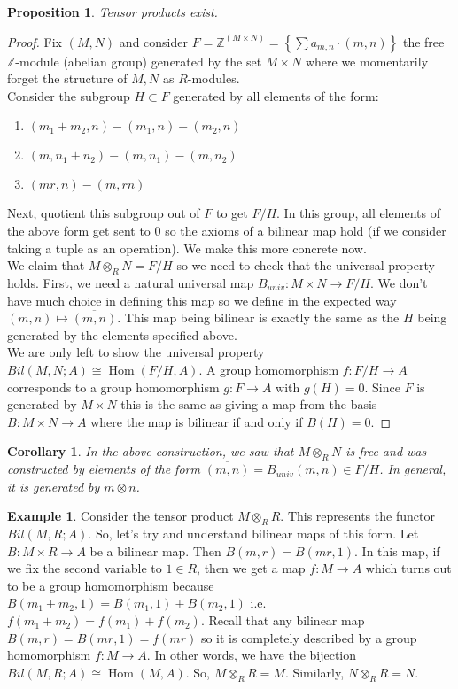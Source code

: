 \documentclass{article}
\newcommand\Z{\ensuremath{\mathbb{Z}}}
\newcommand{\tp}[2]{#1 \otimes_R #2}
\DeclareMathOperator{\Hom}{Hom}
\newtheorem{corollary}{Corollary}[theorem]
\theoremstyle{definition}
\newtheorem{eg}{Example}[subsection]
\theoremstyle{remark}
\theoremstyle{plain}
\newtheorem{prop}{Proposition}[subsection]
\begin{document}
\begin{prop}
    Tensor products exist. 
\end{prop}
\begin{proof}
    Fix \((M,N)\) and consider \(F = \Z^{(M\times N)} = \left\{ \sum a_{m,n}\cdot(m,n) \right\}\) the free \(\Z\)-module 
    (abelian group) generated by the set \(M\times N\) where we momentarily forget the structure of \(M,N\) as \(R\)-modules.\\
    Consider the subgroup \(H \subset F\) generated by all elements of the form:
    \begin{enumerate}
        \item \((m_1 + m_2, n) - (m_1,n) - (m_2, n)\)
        \item \((m, n_1 + n_2) - (m,n_1) - (m, n_2)\)
        \item \((mr,n) - (m, rn)\)
    \end{enumerate}
    Next, quotient this subgroup out of \(F\) to get \(F/H\). In this group, all elements of the above form 
    get sent to \(0\) so the axioms of a bilinear map hold (if we consider taking a tuple as an operation). We make this
    more concrete now.\\ 
    We claim that \(\tp{M}{N} = F/H\) so we need to check that the universal property holds. First, we need a natural universal map \(B_{univ}: M\times N \to F/H\). 
    We don't have much choice in defining this map so we define in the expected way \((m,n) \mapsto \overline{(m,n)}\). This map being bilinear is exactly the same as the \(H\)
    being generated by the elements specified above. \\
    We are only left to show the universal property \(Bil(M,N;A)\cong \Hom(F/H, A)\). A group homomorphism \(f: F/H \to A\) corresponds to a group homomorphism
    \(g: F \to A\) with \(g(H) = 0\). Since \(F\) is generated by \(M\times N\) this is the same as giving a map from the basis \(B: M\times N \to A\) where the map is bilinear if and only if \(B(H) = 0\).
\end{proof}

\begin{corollary}
    In the above construction, we saw that \(\tp{M}{N}\) is free and was constructed by elements of the form \(\overline{(m,n)} = B_{univ}(m,n) \in F/H\). In general, it is generated by \(m\otimes n\).
\end{corollary}

\begin{eg}
    \item Consider the tensor product \(\tp{M}{R}\). This represents the functor \(Bil(M,R;A)\). So, let's try and understand bilinear maps of this form. 
    Let \(B: M\times R \to A\) be a bilinear map. Then \(B(m,r) = B(mr, 1)\). In this map, if we fix the second variable to \(1 \in R\), then we get a map 
    \(f: M \to A\) which turns out to be a group homomorphism because \(B(m_1 + m_2, 1) = B(m_1, 1) + B(m_2, 1)\) i.e. \(f(m_1 + m_2) = f(m_1) + f(m_2)\).
    Recall that any bilinear map \(B(m,r) = B(mr, 1) = f(mr)\) so it is completely described by a group homomorphism \(f: M \to A\). In other words, we have the bijection
    \(Bil(M,R;A)\cong \Hom(M, A)\). So, \(\tp{M}{R} = M\). Similarly, \(\tp{N}{R} = N\).
\end{eg}
\end{document}
